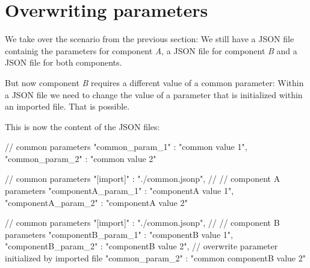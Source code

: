 
\newpage

\section{Overwriting parameters}\label{overwriting-parameters}

We take over the scenario from the previous section: We still have a JSON file  containig the parameters for
component \textit{A}, a JSON file  for component \textit{B} and a JSON file  for both components.

But now component \textit{B} requires a different value of a common parameter: Within a JSON file we need to change the value of a parameter
that is initialized within an imported file. That is possible.

\vspace{2ex}

This is now the content of the JSON files:

\vspace{2ex}

\textbullet {}

\begin{pythoncode}
{
   // common parameters
   "common_param_1" : "common value 1",
   "common_param_2" : "common value 2"
}
\end{pythoncode}

\textbullet {}

\begin{pythoncode}
{
   // common parameters
   "[import]" : "./common.jsonp",
   //
   // component A parameters
   "componentA_param_1" : "componentA value 1",
   "componentA_param_2" : "componentA value 2"
}
\end{pythoncode}

\textbullet {}

\begin{pythoncode}[linebackgroundcolor=\hlcode{8,9}]
{
   // common parameters
   "[import]" : "./common.jsonp",
   //
   // component B parameters
   "componentB_param_1" : "componentB value 1",
   "componentB_param_2" : "componentB value 2",
   // overwrite parameter initialized by imported file
   "common_param_2" : "common componentB value 2"
}
\end{pythoncode}

